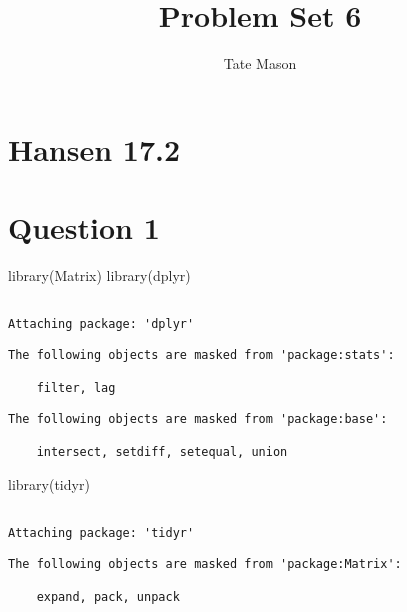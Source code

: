 \documentclass[
  letterpaper,
  DIV=11,
  numbers=noendperiod]{scrartcl}
\title{Problem Set 6}
\author{Tate Mason}
\date{}
\newenvironment{Shaded}{\begin{snugshade}}{\end{snugshade}}
\newcommand{\FunctionTok}[1]{\textcolor[rgb]{0.28,0.35,0.67}{#1}}
\newcommand{\NormalTok}[1]{\textcolor[rgb]{0.00,0.23,0.31}{#1}}
\begin{document}
\maketitle


\section{Hansen 17.2}\label{hansen-17.2}

\section{Question 1}\label{question-1}

\begin{Shaded}
\begin{Highlighting}[]
\FunctionTok{library}\NormalTok{(Matrix)}
\FunctionTok{library}\NormalTok{(dplyr)}
\end{Highlighting}
\end{Shaded}

\begin{verbatim}

Attaching package: 'dplyr'
\end{verbatim}

\begin{verbatim}
The following objects are masked from 'package:stats':

    filter, lag
\end{verbatim}

\begin{verbatim}
The following objects are masked from 'package:base':

    intersect, setdiff, setequal, union
\end{verbatim}

\begin{Shaded}
\begin{Highlighting}[]
\FunctionTok{library}\NormalTok{(tidyr)}
\end{Highlighting}
\end{Shaded}

\begin{verbatim}

Attaching package: 'tidyr'
\end{verbatim}

\begin{verbatim}
The following objects are masked from 'package:Matrix':

    expand, pack, unpack
\end{verbatim}
\end{document}
